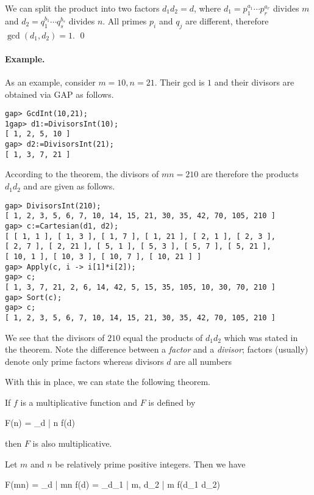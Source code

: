 We can split the product into two factors $d_1 d_2 = d$, where $d_1 = p_1^{a_1} \cdots p_r^{a_r}$ divides $m$ and $d_2 = q_1^{b_1} \cdots q_s^{b_s}$ divides $n$. All primes $p_i$ and $q_j$ are different, therefore $\gcd(d_1, d_2) = 1$. \qed

\paragraph{Example.} As an example, consider $m = 10, n = 21$. Their gcd is $1$ and their divisors are obtained via GAP as follows.

\begin{verbatim}
gap> GcdInt(10,21);
1gap> d1:=DivisorsInt(10);
[ 1, 2, 5, 10 ]
gap> d2:=DivisorsInt(21);
[ 1, 3, 7, 21 ]
\end{verbatim}

According to the theorem, the divisors of $mn = 210$ are therefore the products $d_1 d_2$ and are given as follows.

\begin{verbatim}
gap> DivisorsInt(210);
[ 1, 2, 3, 5, 6, 7, 10, 14, 15, 21, 30, 35, 42, 70, 105, 210 ]
gap> c:=Cartesian(d1, d2);
[ [ 1, 1 ], [ 1, 3 ], [ 1, 7 ], [ 1, 21 ], [ 2, 1 ], [ 2, 3 ], 
[ 2, 7 ], [ 2, 21 ], [ 5, 1 ], [ 5, 3 ], [ 5, 7 ], [ 5, 21 ], 
[ 10, 1 ], [ 10, 3 ], [ 10, 7 ], [ 10, 21 ] ]
gap> Apply(c, i -> i[1]*i[2]);
gap> c;
[ 1, 3, 7, 21, 2, 6, 14, 42, 5, 15, 35, 105, 10, 30, 70, 210 ]
gap> Sort(c);
gap> c;
[ 1, 2, 3, 5, 6, 7, 10, 14, 15, 21, 30, 35, 42, 70, 105, 210 ]
\end{verbatim}

We see that the divisors of $210$ equal the products of $d_1 d_2$ which was stated in the theorem. Note the difference between a \emph{factor} and a \emph{divisor}; factors (usually) denote only prime factors whereas divisors $d$ are all numbers 

With this in place, we can state the following theorem.

\begin{theorem}
    If $f$ is a multiplicative function and $F$ is defined by

    \bee
    F(n) = \sum_{d | n} f(d)
    \eee

    then $F$ is also multiplicative.
\end{theorem}

Let $m$ and $n$ be relatively prime positive integers. Then we have

\bee
F(mn) = \sum_{d | mn} f(d) = \sum_{d_1 | m, d_2 | m} f(d_1 d_2)
\eee

